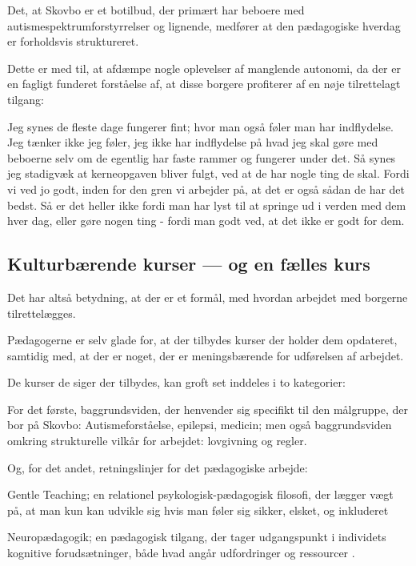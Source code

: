 Det, at Skovbo er et botilbud, der primært har beboere med autismespektrumforstyrrelser og lignende, medfører at den pædagogiske hverdag er forholdsvis struktureret.

Dette er med til, at afdæmpe nogle oplevelser af manglende autonomi, da der er en fagligt funderet forståelse af, at disse borgere profiterer af en nøje tilrettelagt tilgang:
\begin{description}

\AMB
Jeg synes de fleste dage fungerer fint; hvor man også føler man har indflydelse.
Jeg tænker ikke jeg føler, jeg ikke har indflydelse på hvad jeg skal gøre med beboerne selv om de egentlig har faste rammer og fungerer under det.
Så synes jeg stadigvæk at kerneopgaven bliver fulgt, ved at de har nogle ting de skal.
Fordi vi ved jo godt, inden for den gren vi arbejder på, at det er også sådan de har det bedst.
Så er det heller ikke fordi man har lyst til at springe ud i verden med dem hver dag, eller gøre nogen ting - fordi man godt ved, at det ikke er godt for dem.
\end{description}

\subsection{Kulturbærende kurser — og en fælles kurs}
Det har altså betydning, at der er et formål, med hvordan arbejdet med borgerne tilrettelægges.

Pædagogerne er selv glade for, at der tilbydes kurser der holder dem opdateret, samtidig med, at der er noget, der er meningsbærende for udførelsen af arbejdet.

De kurser de siger der tilbydes, kan groft set inddeles i to kategorier:

For det første, baggrundsviden, der henvender sig specifikt til den målgruppe, der bor på Skovbo: Autismeforståelse, epilepsi, medicin; men også baggrundsviden omkring strukturelle vilkår for arbejdet: lovgivning og regler.

Og, for det andet, retningslinjer for det pædagogiske arbejde:

Gentle Teaching; en relationel psykologisk-pædagogisk filosofi, der lægger vægt på, at man kun kan udvikle sig hvis man føler sig sikker, elsket, og inkluderet \autocite[s. 3]{mcgeeGentleTeachingNensom2010}

Neuropædagogik; en pædagogisk tilgang, der tager udgangspunkt i individets kognitive forudsætninger, både hvad angår udfordringer og ressourcer \autocite{socialstyrelsenNeuropaedagogik2018}.

